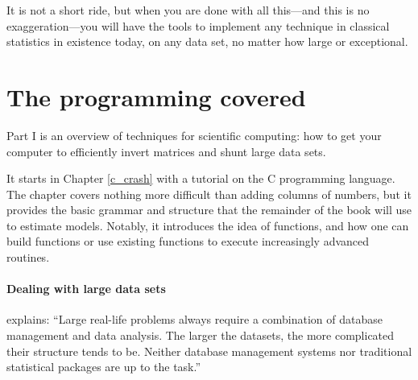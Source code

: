 It is not a short ride, but when you are done with all this---and this
is no exaggeration---you will have the tools to implement any technique
in classical statistics in existence today, on any data set, no matter
how large or exceptional.

\section{The programming covered}

Part I is an overview of techniques for scientific computing: how to get
your computer to efficiently invert matrices and shunt large data sets.

It starts in Chapter \ref{c_crash} with a tutorial on the C programming
language.  The chapter covers nothing more difficult than adding
columns of numbers, but it provides the basic grammar and structure that
the remainder of the book will use to estimate models. Notably,
it introduces the idea of functions, and how one can build functions or
use existing functions to execute increasingly advanced routines.

\paragraph{Dealing with large data sets} 
\citet[p 619]{huber:languages} explains: ``Large real-life problems always require
a combination of database management and data analysis. The larger the
datasets, the more complicated their structure tends to be. Neither
database management systems nor traditional statistical packages are up
to the task.''

